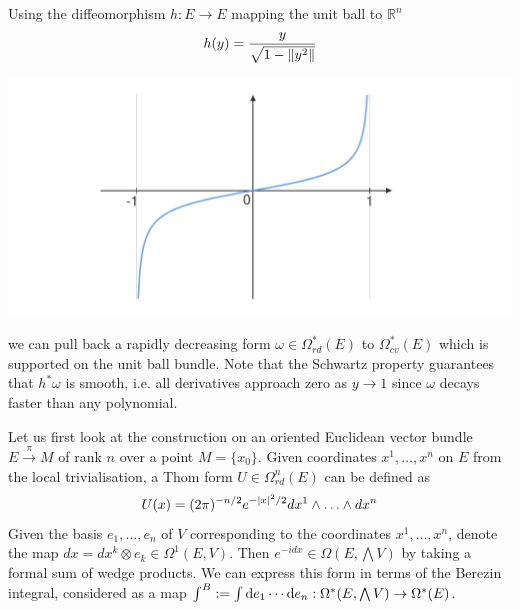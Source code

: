 \hspace{-7mm}
\begin{minipage}{0.5\textwidth}
Using the diffeomorphism $h : E \to E$ mapping the unit ball to $\mathbb{R}^n$
	\[
	h(y) = \frac{y}{\sqrt{1-\norm{y^2}} }
	\] 
\end{minipage}
\begin{minipage}{0.5\textwidth}
		\centering
		\includegraphics[trim={3cm 0 3cm 0},clip,width=\textwidth]{figs/rd_diffeomorphism.pdf}
\end{minipage}
we can pull back a rapidly decreasing form $\omega\in \Omega_{rd}^*(E)$ to 
$\Omega_{cv}^*(E)$ which is supported on the unit ball bundle. 
Note that the Schwartz property guarantees that $h^*\omega$ is smooth, i.e. 
all derivatives approach zero as $y \to 1$ since $\omega$ decays faster than any
polynomial.


Let us first look at the construction on an oriented Euclidean vector bundle
$E\xrightarrow{\pi} M$ of rank $n$ over a point $M=\{x_0\}$. 
Given coordinates $x^1,\ldots,x^n$ on $E$ from the local trivialisation,
a Thom form $U\in \Omega^n_{rd}(E)$ can be defined as
\[
	U(x) = (2\pi)^{-n/2}e^{-\abs{x}^2 /2} dx^1\wedge \ldots\wedge dx^n
\] 
Given the basis $e_1,\ldots,e_n$ of  $V$ corresponding to the coordinates
$x^1,\ldots,x^n$, denote the map $dx = dx^k \otimes e_k \in 
\Omega^1(E, V)$. Then $e^{-idx}\in \Omega(E,\bigwedge V)$ by taking a formal sum
of wedge products.
We can express this form in terms of the Berezin integral,
considered as a map $\int^B := \int \odif{e_1}\cdots\odif{e_n} 
: \Omega^*(E,\bigwedge V) \to \Omega^*(E)$.

